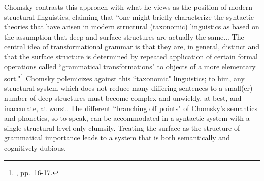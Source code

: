 Chomsky contrasts this approach with what he views as the position of modern structural linguistics, claiming that ``one might briefly characterize the syntactic theories that have arisen in modern structural (taxonomic) linguistics as based on the assumption that deep and surface structures are actually the same... The central idea of transformational grammar is that they are, in general, distinct and that the surface structure is determined by repeated application of certain formal operations called ``grammatical transformations" to objects of a more elementary sort."\footnote{\cite{chomsky1965}, pp.\ 16-17.}  Chomsky polemicizes against this ``taxonomic" linguistics; to him, any structural system which does not reduce many differing sentences to a small(er) number of deep structures must become complex and unwieldy, at best, and inaccurate, at worst.  The different ``branching off points" of Chomsky's semantics and phonetics, so to speak, can be accommodated in a syntactic system with a single structural level only clumsily.  Treating the surface as the structure of grammatical importance leads to a system that is both semantically and cognitively dubious.

